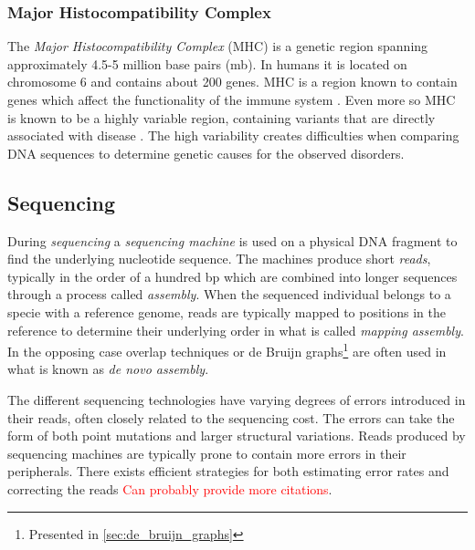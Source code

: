 \documentclass[thesis.tex]{subfiles}
\begin{document}
\subsubsection{Major Histocompatibility Complex}
\label{sec:mhc}
The \textit{Major Histocompatibility Complex} (MHC) is a genetic region spanning approximately 4.5-5 million base pairs (mb)\cite{improved_genome_inference_in_the_mhc_using_a_population_reference_graph}\cite{canonical_stable_general_mapping_using_context_schemes}. In humans it is located on chromosome 6 and contains about 200 genes. MHC is a region known to contain genes which affect the functionality of the immune system \cite{the_importance_of_immune_gene_variability_in_evolutionary_ecology_and_conservation}. Even more so MHC is known to be a highly variable region, containing variants that are directly associated with disease \cite{variation_analysis_and_gene_annotation_of_eight_mhc_haplotypes}. The high variability creates difficulties when comparing DNA sequences to determine genetic causes for the observed disorders.
\subsection{Sequencing}
\label{sec:sequencing}
During \textit{sequencing} a \textit{sequencing machine} is used on a physical DNA fragment to find the underlying nucleotide sequence. The machines produce short \textit{reads}, typically in the order of a hundred bp\cite{sequencing_platforms} which are combined into longer sequences through a process called \textit{assembly}. When the sequenced individual belongs to a specie with a reference genome, reads are typically mapped to positions in the reference to determine their underlying order in what is called \textit{mapping assembly}. In the opposing case overlap techniques\cite{an_eulerian_path_approach_to_dna_fragment_assembly} or de Bruijn graphs\footnote{Presented in \ref{sec:de_bruijn_graphs}} are often used in what is known as \textit{de novo assembly}\cite[Chapter 1, p. 19]{introduction_to_genomics}.\\
\par\noindent
The different sequencing technologies have varying degrees of errors introduced in their reads, often closely related to the sequencing cost\cite{sequencing_platforms}. The errors can take the form of both point mutations and larger structural variations. Reads produced by sequencing machines are typically prone to contain more errors in their peripherals. There exists efficient strategies for both estimating error rates \cite{estimation_of_sequencing_error_rates_in_short_reads} and correcting the reads\cite{error_correction_of_datasets_with_non_uniform_coverage} \textcolor{red}{Can probably provide more citations}.
\end{document}
